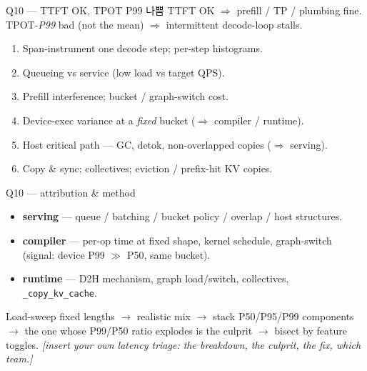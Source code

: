 \begin{frame}{Q10 — TTFT OK, TPOT P99 나쁨}
  TTFT OK $\Rightarrow$ prefill / TP / plumbing fine. TPOT-\emph{P99} bad (not the mean)
  $\Rightarrow$ intermittent decode-loop stalls.
  \begin{enumerate}\setlength\itemsep{1pt}
    \item Span-instrument one decode step; per-step histograms.
    \item Queueing vs service (low load vs target QPS).
    \item Prefill interference; bucket / graph-switch cost.
    \item Device-exec variance at a \emph{fixed} bucket ($\Rightarrow$ compiler / runtime).
    \item Host critical path — GC, detok, non-overlapped copies ($\Rightarrow$ serving).
    \item Copy \& sync; collectives; eviction / prefix-hit KV copies.
  \end{enumerate}
\end{frame}

\begin{frame}{Q10 — attribution \& method}
  \begin{itemize}
    \item \textbf{serving} — queue / batching / bucket policy / overlap / host structures.
    \item \textbf{compiler} — per-op time at fixed shape, kernel schedule, graph-switch
          (signal: device P99 $\gg$ P50, same bucket).
    \item \textbf{runtime} — D2H mechanism, graph load/switch, collectives, \texttt{\_copy\_kv\_cache}.
  \end{itemize}
  Load-sweep fixed lengths $\to$ realistic mix $\to$ stack P50/P95/P99 components $\to$
  the one whose P99/P50 ratio explodes is the culprit $\to$ bisect by feature toggles.
  \vspace{2pt}
  \footnotesize\emph{[insert your own latency triage: the breakdown, the culprit, the fix, which team.]}
\end{frame}
